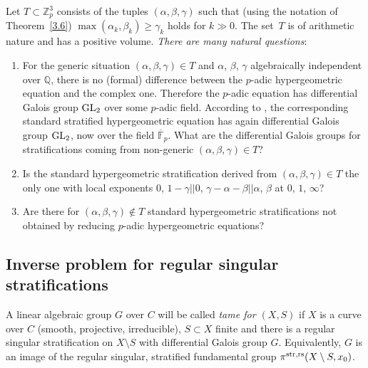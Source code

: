 \documentclass[pdftex]{sigma}
\numberwithin{equation}{section}
\begin{document}
Let $T\subset \mathbb{Z}_p^3$ consists of the tuples $(\alpha ,\beta, \gamma )$ such that (using the notation of Theorem~\ref{3.6}) $\max(\alpha_k,\beta_k)\geq \gamma_k$ holds for $k\gg 0$. The set~$T$ is of arithmetic nature and has a positive volume. {\it There are many natural questions}:
\begin{enumerate}\itemsep=0pt
\item[(a)] For the generic situation $(\alpha, \beta ,\gamma )\in T$ and $\alpha$, $\beta$, $\gamma$ algebraically independent over $\mathbb{Q}$, there is no (formal) difference between the $p$-adic hypergeometric equation and the complex one. Therefore the $p$-adic equation has differential Galois group ${\rm GL}_2$ over some $p$-adic field. According to \cite[Section~8]{Ma-vdP1}, the corresponding standard stratified hypergeometric equation has again differential Galois group ${\rm GL}_2$, now over the field $\overline{\mathbb{F}}_p$. What are the differential Galois groups for stratifications coming from non-generic $(\alpha,\beta,\gamma)\in T$?
\item[(b)] Is the standard hypergeometric stratification derived from $(\alpha, \beta ,\gamma )\in T$ the only one with local exponents $ 0$, $1-\gamma || 0$, $\gamma -\alpha -\beta || \alpha$, $\beta $ at $0$, $1$, $\infty$?
\item[(c)] Are there for $(\alpha, \beta, \gamma )\not \in T$ standard hypergeometric stratifications not obtained by reducing $p$-adic hypergeometric equations?
\end{enumerate}

\subsection{Inverse problem for regular singular stratifications}\label{section3.3}
A linear algebraic group $G$ over $C$ will be called {\it tame for $(X,S)$} if $X$ is a curve over $C$ (smooth, projective, irreducible), $S\subset X$ finite and there is a regular singular stratification on $X\setminus S$ with differential Galois group $G$. Equivalently, $G$ is an image of the regular singular, stratified fundamental group $\pi^{\rm str,rs}(X\setminus S,x_0)$.
\end{document}
